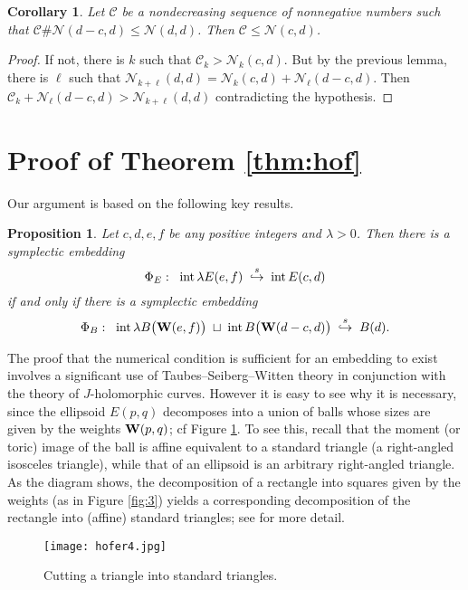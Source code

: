 \documentclass[11pt]{amsart}
\newcommand{\labell}[1] {\label{#1}}
\newcommand{\1}{{{\mathchoice {\rm 1\mskip-4mu l} {\rm 1\mskip-4mu l}
{\rm 1\mskip-4.5mu l} {\rm 1\mskip-5mu l}}}}
\newcommand{\bW} {{\bf W}}
\newcommand{\intt}{{\rm int\,}}
\newcommand{\la}{{\lambda}}
\newcommand{\Cc}{{\mathcal C}}
\newcommand{\Nn}{{\mathcal N}}
\newcommand{\se} {{\stackrel{s}\hookrightarrow}}
\newtheorem{cor}[theorem]{Corollary}
\newtheorem{prop}[theorem]{Proposition}
\numberwithin{figure}{section}
\numberwithin{equation}{section}
\begin{document}
  \begin{cor}\labell{cor:2} Let $\Cc$ be a nondecreasing sequence of nonnegative numbers
  such  that $\Cc\#\Nn(d-c,d)\le \Nn(d,d)$.  Then
  $\Cc\le \Nn(c,d)$.
  \end{cor}
  \begin{proof}  If not, there is $k$ such that $\Cc_k> \Nn_k(c,d)$.   
But by the previous lemma, there is $\ell$ such that  $\Nn_{k+\ell}(d,d) 
= \Nn_k(c,d) + 
  \Nn_\ell(d-c,d)$.  Then $\Cc_k+\Nn_\ell(d-c,d) > \Nn_{k+\ell}(d,d)$ 
contradicting the hypothesis.
  \end{proof}
  
   
\section{Proof of Theorem \ref{thm:hof}}

Our argument is based on the following key results.

%
\begin{prop}\labell{prop:M} \cite[Thm.~3.11]{M}
Let $c,d,e,f$ be any positive integers and $\la>0$.  Then there is a
symplectic embedding 
$$
\Phi_E:\;\; \intt \la  E(e,f)\;\;\se \;\;\intt E(c,d)
$$
 if and only if there is a
symplectic embedding 
$$
\Phi_B:\;\;  \intt \la B\bigl(\bW(e,f)\bigr)\; \sqcup\; \intt B\bigl(\bW(d-c, d)\bigr)\;\;\se\;\; B(d).
$$
\end{prop}

The proof that the numerical condition is sufficient  for an embedding to exist
involves a significant use of Taubes--Seiberg--Witten theory in conjunction with
the theory of $J$-holomorphic curves.  However it is easy to see why
it is necessary, since the ellipsoid  $E(p,q)$ decomposes into a union of balls
 whose sizes are given by the weights $\bW(p,q)$; cf Figure \ref{fig:4}.
 To see this, recall that the
 moment (or toric) image of the ball is affine equivalent to a standard triangle (a right-angled isosceles triangle), while that of an ellipsoid is an arbitrary right-angled triangle.  As the diagram shows,  the 
decomposition  of a rectangle into squares given by the weights (as in Figure \ref{fig:3}) yields a
corresponding decomposition of the rectangle into (affine) standard triangles; see  
\cite[\S2]{Mcf} for more detail.
 
\begin{figure}[htbp] %
   \centering
   \texttt{[image: hofer4.jpg]} 
   \caption{Cutting a triangle  into standard triangles.}
   \label{fig:4}
\end{figure}
\end{document}
